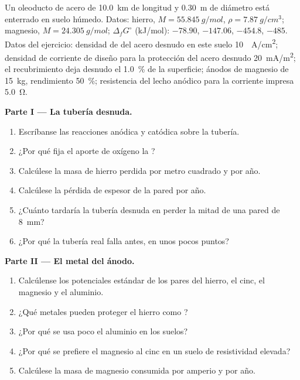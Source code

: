 \begin{problem}
\label{pb:b2:corrosion:1}
Un oleoducto de acero de \qty{10.0}{km} de longitud y \qty{0.30}{m} de diámetro está enterrado en
suelo húmedo. Datos: hierro, $M = \qty{55.845}{g/mol}$, $\rho = \qty{7.87}{g/cm^3}$;
magnesio, $M = \qty{24.305}{g/mol}$; $\Delta_f G^\circ$ (\unit{kJ/mol}): 
$-78.90$,  $-147.06$,  $-454.8$,  $-485$. Datos del
ejercicio: densidad de  del acero desnudo en este suelo \qty{10}{\micro
A/cm^2}; densidad de corriente de diseño para la protección del acero desnudo
\qty{20}{mA/m^2}; el recubrimiento deja desnudo el 1.0~\% de la superficie; ánodos de magnesio
de \qty{15}{kg}, rendimiento 50~\%; resistencia del lecho anódico para la corriente impresa
\qty{5.0}{\ohm}.

\medskip
\noindent\textbf{Parte I --- La tubería desnuda.}
\begin{enumerate}
  \item Escríbanse las reacciones anódica y catódica sobre la tubería.
  \item ¿Por qué fija el aporte de oxígeno la ?
  \item Calcúlese la masa de hierro perdida por metro cuadrado y por año.
  \item Calcúlese la pérdida de espesor de la pared por año.
  \item ¿Cuánto tardaría la tubería desnuda en perder la mitad de una pared de \qty{8}{mm}?
  \item ¿Por qué la tubería real falla antes, en unos pocos puntos?
\end{enumerate}

\medskip
\noindent\textbf{Parte II --- El metal del ánodo.}
\begin{enumerate}[resume]
  \item Calcúlense los potenciales estándar de los pares del hierro, el cinc, el magnesio
        y el aluminio.
  \item ¿Qué metales pueden proteger el hierro como ?
  \item ¿Por qué se usa poco el aluminio en los suelos?
  \item ¿Por qué se prefiere el magnesio al cinc en un suelo de resistividad elevada?
  \item Calcúlese la masa de magnesio consumida por amperio y por año.
\end{enumerate}


\end{problem}
